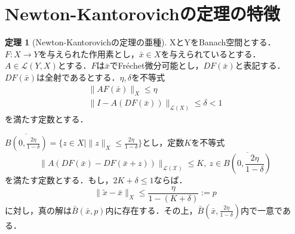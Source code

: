 \documentclass[11pt,a4paper,titlepage]{jsreport}
\theoremstyle{definition}
\newtheorem{thm}{定理}
\begin{document}
\section{Newton-Kantorovichの定理の特徴\cite{}}
\begin{thm}[Newton-Kantorovichの定理の亜種]
  XとYをBanach空間とする．$F:X\rightarrow Y$を与えられた作用素とし，$\bar{x}\in X$を与えられているとする．$A\in \mathcal{L}(Y,X)$とする．$F$は$\bar{x}$でFr\'{e}chet微分可能とし，$DF(\bar{x})$と表記する．$DF(\bar{x})$は全射であるとする．$\eta,\delta$を不等式
  \begin{align*}
    \|AF(\bar{x})\|_X \leq \eta \\
    \|I-A(DF(\bar{x}))\|_{\mathcal{L}(X)} \leq \delta < 1
  \end{align*}
  を満たす定数とする．

  $\overline{B(0,\frac{2\eta}{1-\delta})} = \{z\in X \mid \|z\|_X \leq \frac{2\eta}{1-\delta} \}$とし，定数$K$を不等式
  \begin{equation*}
    \|A(DF(\bar{x})-DF(\bar{x}+z))\|_\mathcal{{L}(X)} \leq K,\ z\in \overline{B\left(0,\frac{2\eta}{1-\delta}\right)}
  \end{equation*}
  を満たす定数とする．もし，$2K+\delta\leq 1$ならば．
  \begin{equation*}
    \|\tilde{x}-\bar{x}\|_X \leq \frac{\eta}{1-(K+\delta)} := p
  \end{equation*}
  に対し，真の解は$\bar{B}(\bar{x},p)$内に存在する．その上，$\bar{B}\left(\bar{x},\frac{2\eta}{1-\delta}\right)$内で一意である．
\end{thm}
\end{document}
